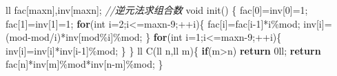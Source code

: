 \documentclass[
]{article}
\newenvironment{Shaded}{}{}
\newcommand{\BuiltInTok}[1]{\textcolor[rgb]{0.00,0.50,0.00}{#1}}
\newcommand{\CommentTok}[1]{\textcolor[rgb]{0.38,0.63,0.69}{\textit{#1}}}
\newcommand{\ControlFlowTok}[1]{\textcolor[rgb]{0.00,0.44,0.13}{\textbf{#1}}}
\newcommand{\DataTypeTok}[1]{\textcolor[rgb]{0.56,0.13,0.00}{#1}}
\newcommand{\DecValTok}[1]{\textcolor[rgb]{0.25,0.63,0.44}{#1}}
\newcommand{\NormalTok}[1]{#1}
\newcommand{\OperatorTok}[1]{\textcolor[rgb]{0.40,0.40,0.40}{#1}}
\begin{document}
\begin{Shaded}
\begin{Highlighting}[]
\NormalTok{ll fac}\OperatorTok{[}\NormalTok{maxn}\OperatorTok{],}\NormalTok{inv}\OperatorTok{[}\NormalTok{maxn}\OperatorTok{];}
\CommentTok{//逆元法求组合数}
\DataTypeTok{void}\NormalTok{ init}\OperatorTok{()}
\OperatorTok{\{}
\NormalTok{    fac}\OperatorTok{[}\DecValTok{0}\OperatorTok{]=}\NormalTok{inv}\OperatorTok{[}\DecValTok{0}\OperatorTok{]=}\DecValTok{1}\OperatorTok{;}
\NormalTok{    fac}\OperatorTok{[}\DecValTok{1}\OperatorTok{]=}\NormalTok{inv}\OperatorTok{[}\DecValTok{1}\OperatorTok{]=}\DecValTok{1}\OperatorTok{;}
    \ControlFlowTok{for}\OperatorTok{(}\DataTypeTok{int}\NormalTok{ i}\OperatorTok{=}\DecValTok{2}\OperatorTok{;}\NormalTok{i}\OperatorTok{\textless{}=}\NormalTok{maxn}\OperatorTok{{-}}\DecValTok{9}\OperatorTok{;++}\NormalTok{i}\OperatorTok{)\{}
\NormalTok{        fac}\OperatorTok{[}\NormalTok{i}\OperatorTok{]=}\NormalTok{fac}\OperatorTok{[}\NormalTok{i}\OperatorTok{{-}}\DecValTok{1}\OperatorTok{]*}\NormalTok{i}\OperatorTok{\%}\NormalTok{mod}\OperatorTok{;}
\NormalTok{        inv}\OperatorTok{[}\NormalTok{i}\OperatorTok{]=(}\NormalTok{mod}\OperatorTok{{-}}\NormalTok{mod}\OperatorTok{/}\NormalTok{i}\OperatorTok{)*}\NormalTok{inv}\OperatorTok{[}\NormalTok{mod}\OperatorTok{\%}\NormalTok{i}\OperatorTok{]\%}\NormalTok{mod}\OperatorTok{;}
    \OperatorTok{\}}
    \ControlFlowTok{for}\OperatorTok{(}\DataTypeTok{int}\NormalTok{ i}\OperatorTok{=}\DecValTok{1}\OperatorTok{;}\NormalTok{i}\OperatorTok{\textless{}=}\NormalTok{maxn}\OperatorTok{{-}}\DecValTok{9}\OperatorTok{;++}\NormalTok{i}\OperatorTok{)\{}
\NormalTok{        inv}\OperatorTok{[}\NormalTok{i}\OperatorTok{]=}\NormalTok{inv}\OperatorTok{[}\NormalTok{i}\OperatorTok{]*}\NormalTok{inv}\OperatorTok{[}\NormalTok{i}\OperatorTok{{-}}\DecValTok{1}\OperatorTok{]\%}\NormalTok{mod}\OperatorTok{;}
    \OperatorTok{\}}
\OperatorTok{\}}
\NormalTok{ll C}\OperatorTok{(}\NormalTok{ll n}\OperatorTok{,}\NormalTok{ll m}\OperatorTok{)\{}
    \ControlFlowTok{if}\OperatorTok{(}\NormalTok{m}\OperatorTok{\textgreater{}}\NormalTok{n}\OperatorTok{)} \ControlFlowTok{return} \DecValTok{0}\BuiltInTok{ll}\OperatorTok{;}
    \ControlFlowTok{return}\NormalTok{ fac}\OperatorTok{[}\NormalTok{n}\OperatorTok{]*}\NormalTok{inv}\OperatorTok{[}\NormalTok{m}\OperatorTok{]\%}\NormalTok{mod}\OperatorTok{*}\NormalTok{inv}\OperatorTok{[}\NormalTok{n}\OperatorTok{{-}}\NormalTok{m}\OperatorTok{]\%}\NormalTok{mod}\OperatorTok{;}
\OperatorTok{\}}
\end{Highlighting}
\end{Shaded}
\end{document}
